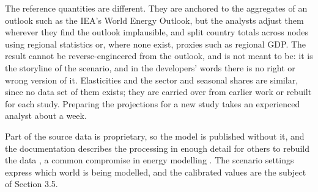 The reference quantities are different.
They are anchored to the aggregates of an outlook such as the IEA's World Energy Outlook, but the analysts adjust them wherever they find the outlook implausible, and split country totals across nodes using regional statistics or, where none exist, proxies such as regional GDP.
The result cannot be reverse-engineered from the outlook, and is not meant to be: it is the storyline of the scenario, and in the developers' words there is no right or wrong version of it.
Elasticities and the sector and seasonal shares are similar, since no data set of them exists; they are carried over from earlier work or rebuilt for each study.
Preparing the projections for a new study takes an experienced analyst about a week.

Part of the source data is proprietary, so the model is published without it, and the documentation describes the processing in enough detail for others to rebuild the data \citep[p.~8]{egging2019global}, a common compromise in energy modelling \citep{pfenninger2017importance}.
The scenario settings express which world is being modelled, and the calibrated values are the subject of Section 3.5.

